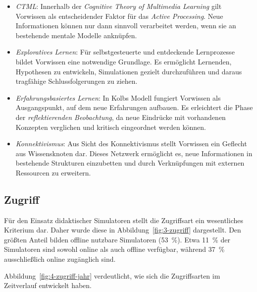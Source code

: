 \begin{itemize}
    \item \textit{\ac{CTML}}: Innerhalb der \textit{Cognitive Theory of Multimedia Learning} gilt Vorwissen als entscheidender Faktor für das \textit{Active Processing}. Neue Informationen können nur dann sinnvoll verarbeitet werden, wenn sie an bestehende mentale Modelle anknüpfen.
    \item \textit{Exploratives Lernen}: Für selbstgesteuerte und entdeckende Lernprozesse bildet Vorwissen eine notwendige Grundlage. Es ermöglicht Lernenden, Hypothesen zu entwickeln, Simulationen gezielt durchzuführen und daraus tragfähige Schlussfolgerungen zu ziehen.
    \item \textit{Erfahrungsbasiertes Lernen}: In Kolbs Modell fungiert Vorwissen als Ausgangspunkt, auf dem neue Erfahrungen aufbauen. Es erleichtert die Phase der \textit{reflektierenden Beobachtung}, da neue Eindrücke mit vorhandenen Konzepten verglichen und kritisch eingeordnet werden können.
    \item \textit{Konnektivismus}: Aus Sicht des Konnektivismus stellt Vorwissen ein Geflecht aus Wissensknoten dar. Dieses Netzwerk ermöglicht es, neue Informationen in bestehende Strukturen einzubetten und durch Verknüpfungen mit externen Ressourcen zu erweitern.
\end{itemize}

\subsection{Zugriff}

Für den Einsatz didaktischer Simulatoren stellt die Zugriffsart ein wesentliches Kriterium dar. Daher wurde diese in Abbildung~\ref{fig:3-zugriff} dargestellt. Den größten Anteil bilden offline nutzbare Simulatoren (53~\%). Etwa 11~\% der Simulatoren sind sowohl online als auch offline verfügbar, während 37~\% ausschließlich online zugänglich sind.

Abbildung~\ref{fig:4-zugriff-jahr} verdeutlicht, wie sich die Zugriffsarten im Zeitverlauf entwickelt haben.

